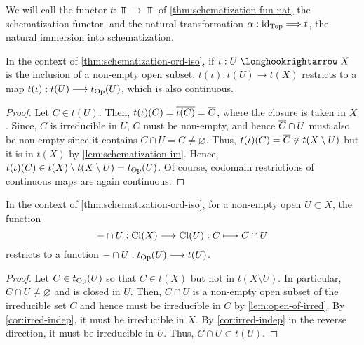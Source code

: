 \begin{defn}
We will call the functor $t : \Top \to \Top$ of
\cref{thm:schematization-fun-nat} the schematization functor, and
the natural transformation $\alpha : \id_\Top \To t$,
the natural immersion into schematization.
\end{defn}

\begin{lem}\label{lem:schemat-open}
In the context of \cref{thm:schematization-ord-iso},
if $\iota : U \hto X$ is the inclusion of a non-empty open subset,
$t(\iota) : t(U) \to t(X)$ restricts to a map
$t(\iota) : t(U) \to t_\Op(U)$, which is also continuous.
\end{lem}
\begin{proof}
Let $C \in t(U)$. Then, $t(\iota)(C) = \cls{\iota(C)} = \cls{C}$, where
the closure is taken in $X$. Since, $C$ is irreducible in $U$, $C$ must
be non-empty, and hence $\cls{C} \cap U$ must also be non-empty since it contains $C \cap U = C \neq \varnothing$. Thus,
$t(\iota)(C) = \cls{C} \not\in t(X \setminus U)$ but it is in $t(X)$
by \cref{lem:schematization-im}.
Hence, $t(\iota)(C) \in t(X) \setminus t(X \setminus U) = t_{\mathrm{Op}}(U)$.
Of course, codomain restrictions of continuous maps are again continuous.
\end{proof}

\begin{lem}\label{lem:schemat-open-int}
In the context of \cref{thm:schematization-ord-iso},
for a non-empty open $U \subset X$, the function
\[
- \cap U : \Cl(X) \to \Cl(U) : C \mapsto C \cap U
\]
restricts to a function $- \cap U : t_\Op(U) \to t(U)$.
\end{lem}
\begin{proof}
Let $C \in t_{\mathrm{Op}}(U)$ so that $C \in t(X)$ but not in $t(X \setminus U)$.
In particular, $C \cap U \neq \varnothing$ and is closed in $U$.
Then, $C \cap U$ is a non-empty open subset of the irreducible set $C$
and hence must be irreducible in $C$ by \cref{lem:open-of-irred}.
By \cref{cor:irred-indep}, it must be irreducible in $X$.
By \cref{cor:irred-indep} in the reverse direction, it must be irreducible
in $U$. Thus, $C \cap U \subset t(U)$.
\end{proof}

